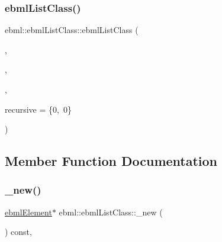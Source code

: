 \mbox{\label{classebml_1_1ebmlListClass_ab4ab60f7ad49e7728568920530d32dff}} 
\subsubsection{\texorpdfstring{ebml\+List\+Class()}{ebmlListClass()}\hspace{0.1cm}{\footnotesize\ttfamily [6/6]}}
{\footnotesize\ttfamily ebml\+::ebml\+List\+Class\+::ebml\+List\+Class (\begin{DoxyParamCaption}\item[{\mbox{\hyperlink{namespaceebml_a86c5f604ddf12a74aa9812e997a58691}{ebml\+I\+D\+\_\+t}}}]{,  }\item[{const std\+::wstring \&}]{,  }\item[{\mbox{\hyperlink{namespaceebml_a40cf7ad4b58caaa8c07da3ed83f7a431}{child\+Class\+Spec\+Arg\+\_\+init\+\_\+l}}}]{,  }\item[{const \mbox{\hyperlink{structebml_1_1occurSpec__t}{occur\+Spec\+\_\+t}} \&}]{recursive = {\ttfamily \{0,~0\}} }\end{DoxyParamCaption})}



\subsection{Member Function Documentation}
\mbox{\label{classebml_1_1ebmlListClass_aef729ee70f218de1013c3782c481bffb}} 
\subsubsection{\texorpdfstring{\+\_\+new()}{\_new()}}
{\footnotesize\ttfamily \mbox{\hyperlink{classebml_1_1ebmlElement}{ebml\+Element}}$\ast$ ebml\+::ebml\+List\+Class\+::\+\_\+new (\begin{DoxyParamCaption}{ }\end{DoxyParamCaption}) const\hspace{0.3cm}{\ttfamily [protected]}, {\ttfamily [virtual]}}



